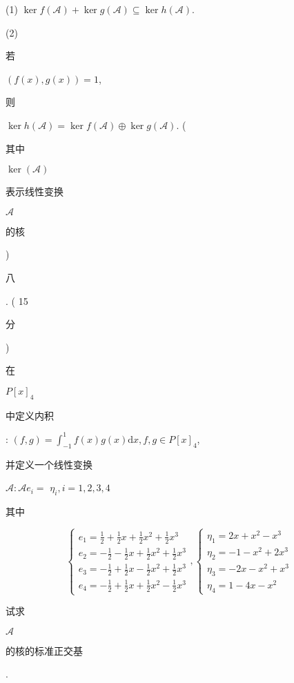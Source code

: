 \documentclass[10pt]{article}
\begin{document}
(1) $\operatorname{ker} f(\mathscr{A})+\operatorname{ker} g(\mathscr{A}) \subseteq \operatorname{ker} h(\mathscr{A})$.

(2) \begin{CJK}{UTF8}{mj}若\end{CJK} $(f(x), g(x))=1$, \begin{CJK}{UTF8}{mj}则\end{CJK} $\operatorname{ker} h(\mathscr{A})=\operatorname{ker} f(\mathscr{A}) \oplus \operatorname{ker} g(\mathscr{A})$. (\begin{CJK}{UTF8}{mj}其中\end{CJK} $\operatorname{ker}(\mathscr{A})$ \begin{CJK}{UTF8}{mj}表示线性变换\end{CJK} $\mathscr{A}$ \begin{CJK}{UTF8}{mj}的核\end{CJK})

\begin{CJK}{UTF8}{mj}八\end{CJK}. ( 15 \begin{CJK}{UTF8}{mj}分\end{CJK}) \begin{CJK}{UTF8}{mj}在\end{CJK} $P[x]_{4}$ \begin{CJK}{UTF8}{mj}中定义内积\end{CJK}: $(f, g)=\int_{-1}^{1} f(x) g(x) \mathrm{d} x, f, g \in P[x]_{4}$, \begin{CJK}{UTF8}{mj}并定义一个线性变换\end{CJK} $\mathscr{A}: \mathscr{A} e_{i}=$ $\eta_{i}, i=1,2,3,4$ \begin{CJK}{UTF8}{mj}其中\end{CJK}
$$
\left\{\begin{array}{l}
e_{1}=\frac{1}{2}+\frac{1}{2} x+\frac{1}{2} x^{2}+\frac{1}{2} x^{3} \\
e_{2}=-\frac{1}{2}-\frac{1}{2} x+\frac{1}{2} x^{2}+\frac{1}{2} x^{3} \\
e_{3}=-\frac{1}{2}+\frac{1}{2} x-\frac{1}{2} x^{2}+\frac{1}{2} x^{3} \\
e_{4}=-\frac{1}{2}+\frac{1}{2} x+\frac{1}{2} x^{2}-\frac{1}{2} x^{3}
\end{array},\left\{\begin{array}{l}
\eta_{1}=2 x+x^{2}-x^{3} \\
\eta_{2}=-1-x^{2}+2 x^{3} \\
\eta_{3}=-2 x-x^{2}+x^{3} \\
\eta_{4}=1-4 x-x^{2}
\end{array}\right.\right.
$$
\begin{CJK}{UTF8}{mj}试求\end{CJK} $\mathscr{A}$ \begin{CJK}{UTF8}{mj}的核的标准正交基\end{CJK}.
\end{document}
